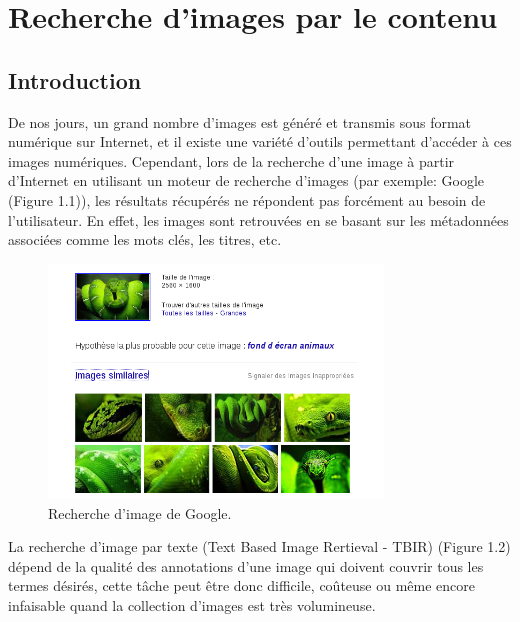 
\chapter{Recherche d'images par le contenu} %




\section{Introduction}

	De nos jours, un grand nombre d'images est généré et transmis sous format numérique sur Internet, et il existe une variété d'outils permettant d'accéder à ces images numériques. Cependant, lors de la recherche d'une image à partir d'Internet en utilisant un moteur de recherche d'images (par exemple: Google (Figure 1.1)), les résultats récupérés ne répondent pas forcément au besoin de l'utilisateur. En effet, les images sont retrouvées en se basant sur les métadonnées associées comme les mots clés, les titres, etc.
	
	
\begin{figure}[H]
	\centering
		\includegraphics[width=3.5in]{Figures/googleImage2.png}
	\caption[An Electron]{Recherche d'image de Google.}
	\label{fig:Electron}
\end{figure}

	La recherche d'image par texte (Text Based Image Rertieval - TBIR) (Figure 1.2) dépend de la qualité des annotations d'une image qui doivent couvrir tous les termes désirés, cette tâche peut être donc difficile, coûteuse ou même encore infaisable quand la collection d'images est très volumineuse.
	

